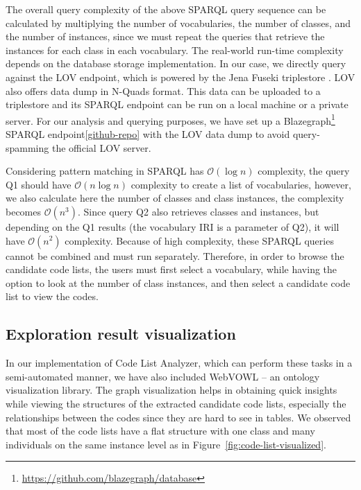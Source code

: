 The overall query complexity of the above SPARQL query sequence can be calculated by multiplying the number of vocabularies, the number of classes, and the number of instances, since we must repeat the queries that retrieve the instances for each class in each vocabulary. The real-world run-time complexity depends on the database storage implementation. In our case, we directly query against the LOV endpoint, which is powered by the Jena Fuseki triplestore \cite{DBLP:journals/semweb/VandenbusscheAP17}. %
LOV also offers data dump in N-Quads format. This data can be uploaded to a triplestore and its SPARQL endpoint can be run on a local machine or a private server. For our analysis and querying purposes, we have set up a Blazegraph\footnote{\url{https://github.com/blazegraph/database}} SPARQL endpoint\cref{github-repo} with the LOV data dump to avoid query-spamming the official LOV server.

Considering pattern matching in SPARQL has $\mathcal{O}(\log{}n)$ complexity, the query Q1 should have $\mathcal{O}(n\log{}n)$ complexity to create a list of vocabularies, however, we also calculate here the number of classes and class instances, the complexity becomes $\mathcal{O}(n^3)$. Since query Q2 also retrieves classes and instances, but depending on the Q1 results (the vocabulary IRI is a parameter of Q2), it will have $\mathcal{O}(n^2)$ complexity. Because of high complexity, these SPARQL queries cannot be combined and must run separately. Therefore, in order to browse the candidate code lists, the users must first select a vocabulary, while having the option to look at the number of class instances, and then select a candidate code list to view the codes.

\subsection{Exploration result visualization}

In our implementation of Code List Analyzer, which can perform these tasks in a semi-automated manner, we have also included WebVOWL \cite{DBLP:journals/semweb/LohmannNHE15} -- an ontology visualization library. The graph visualization helps in obtaining quick insights while viewing the structures of the extracted candidate code lists, especially the relationships between the codes since they are hard to see in tables. We observed that most of the code lists have a flat structure with one class and many individuals on the same instance level as in Figure~\ref{fig:code-list-visualized}.
